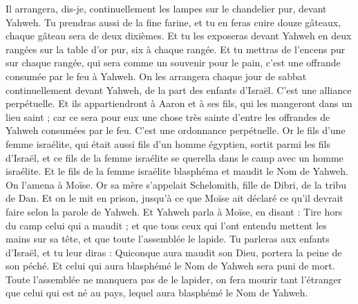 \begin{multicols}{2}
Il arrangera, dis-je, continuellement les lampes sur le chandelier pur, devant Yahweh.
Tu prendras aussi de la fine farine, et tu en feras cuire douze gâteaux, chaque gâteau sera de deux dixièmes.
Et tu les exposeras devant Yahweh en deux rangées sur la table d'or pur, six à chaque rangée.
Et tu mettras de l'encens pur sur chaque rangée, qui sera comme un souvenir pour le pain, c'est une offrande consumée par le feu à Yahweh.
On les arrangera chaque jour de sabbat continuellement devant Yahweh, de la part des enfants d'Israël. C'est une alliance perpétuelle.
Et ils appartiendront à Aaron et à ses fils, qui les mangeront dans un lieu saint ; car ce sera pour eux une chose très sainte d'entre les offrandes de Yahweh consumées par le feu. C'est une ordonnance perpétuelle.
Or le fils d'une femme israélite, qui était aussi fils d'un homme égyptien, sortit parmi les fils d'Israël, et ce fils de la femme israélite se querella dans le camp avec un homme israélite.
Et le fils de la femme israélite blasphéma et maudit le Nom de Yahweh. On l'amena à Moïse. Or sa mère s'appelait Schelomith, fille de Dibri, de la tribu de Dan.
Et on le mit en prison, jusqu'à ce que Moïse ait déclaré ce qu'il devrait faire selon la parole de Yahweh.
Et Yahweh parla à Moïse, en disant :
Tire hors du camp celui qui a maudit ; et que tous ceux qui l'ont entendu mettent les mains sur sa tête, et que toute l'assemblée le lapide.
Tu parleras aux enfants d'Israël, et tu leur diras : Quiconque aura maudit son Dieu, portera la peine de son péché.
Et celui qui aura blasphémé le Nom de Yahweh sera puni de mort. Toute l'assemblée ne manquera pas de le lapider, on fera mourir tant l'étranger que celui qui est né au pays, lequel aura blasphémé le Nom de Yahweh.

\end{multicols}
